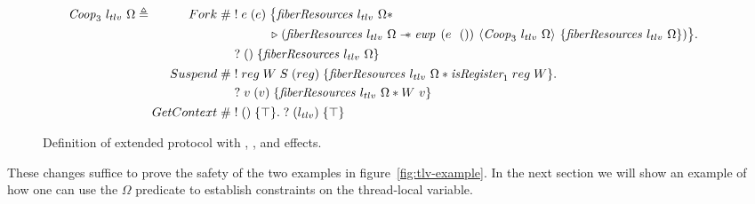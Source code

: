 \begin{figure}[ht]
  \begin{align*}
    \proto{3}~l_{tlv}~\Omega & \triangleq \begin{aligned}[t]
                                            Fork\;       & \#\; \begin{aligned}[t]
                             & !\; e\; (e)\; \begin{aligned}[t]
                            & \big\{ \gsFiberResources{l_{tlv}}{\Omega} \ast                                                                                             \\
                            & \later\; (\gsFiberResources{l_{tlv}}{\Omega} \wand{} \ewp{e\ \ ()}{\proto{3}~l_{tlv}~\Omega}{\gsFiberResources{l_{tlv}}{\Omega}}) \big\} .
                         \end{aligned} \\
                             & ?\; ()\; \{ \gsFiberResources{l_{tlv}}{\Omega} \}
                          \end{aligned}                                                 \\
                                            Suspend\;    & \#\; \begin{aligned}[t]
                             & !\; reg\; W\; S\; (reg)\; \{\gsFiberResources{l_{tlv}}{\Omega} \ast \gsIsReg{1}\; reg\; W\}. \\
                             & ?\; v\; (v)\; \{ \gsFiberResources{l_{tlv}}{\Omega} \ast W~v \}
                          \end{aligned} \\
                                            GetContext\; & \#\; !\; ()\; \{\top\}.\; ?\; (l_{tlv})\; \{ \top \}
                                          \end{aligned}
  \end{align*}
  \caption{Definition of extended  protocol with \efork{}, \esuspend{}, and \egetctx{} effects.}
  \label{fig:coop-protocol-ext}
\end{figure}
%
These changes suffice to prove the safety of the two examples in figure~\ref{fig:tlv-example}.
In the next section we will show an example of how one can use the \(\Omega\) predicate to establish constraints on the thread-local variable.

